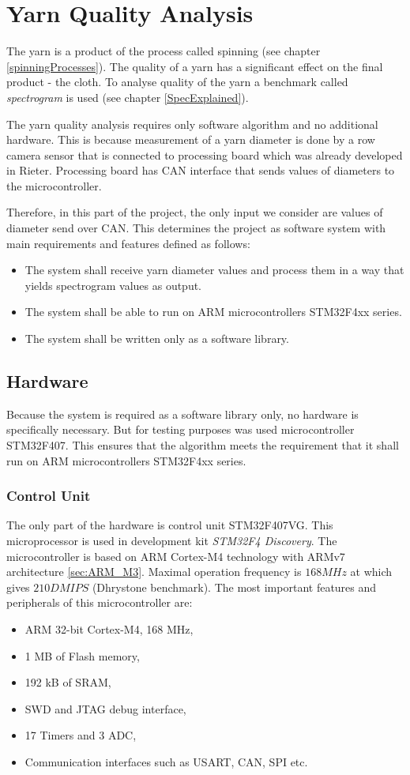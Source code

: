 \documentclass[twoside]{ctuthesis}
\theoremstyle{plain}
\theoremstyle{definition}
\theoremstyle{note}
\begin{document}
\section{Yarn Quality Analysis}
The yarn is a product of the process called spinning (see chapter \ref{spinningProcesses}). The quality of a yarn has a significant effect on the final product - the cloth. To analyse quality of the yarn a benchmark called \textit{spectrogram} is used (see chapter \ref{SpecExplained}).

The yarn quality analysis requires only software algorithm and no additional hardware. This is because measurement of a yarn diameter is done by a row camera sensor that is connected to processing board which was already developed in Rieter. Processing board has CAN interface that sends values of diameters to the microcontroller. 

Therefore, in this part of the project, the only input we consider are values of diameter send over CAN. This determines the project as software system with main requirements and features defined as follows:
\begin{itemize}
	\setlength{\itemsep}{5pt}
	\item The system shall receive yarn diameter values and process them in a way that yields spectrogram values as output.
	\item The system shall be able to run on ARM microcontrollers STM32F4xx series.
	\item The system shall be written only as a software library.
\end{itemize}

\subsection{Hardware}
Because the system is required as a software library only, no hardware is specifically necessary. But for testing purposes was used microcontroller STM32F407. This ensures that the algorithm meets the requirement that it shall run on ARM microcontrollers STM32F4xx series.
\subsubsection{Control Unit}
\label{sec:microControllerYarn}
The only part of the hardware is control unit STM32F407VG. This microprocessor is used in development kit \textit{STM32F4 Discovery}.
The microcontroller is based on ARM Cortex-M4 technology with ARMv7 architecture \ref{sec:ARM_M3}. Maximal operation frequency is $168 MHz$ at which gives $210 DMIPS$ (Dhrystone benchmark). The most important features and peripherals of this microcontroller are:
\begin{itemize}
	\setlength{\itemsep}{5pt}
	\item ARM 32-bit Cortex-M4, 168 MHz,
	\item 1 MB of Flash memory,
	\item 192 kB of SRAM,
	\item SWD and JTAG debug interface,
	\item 17 Timers and 3 ADC,
	\item Communication interfaces such as USART, CAN, SPI etc.
\end{itemize}    
\end{document}
